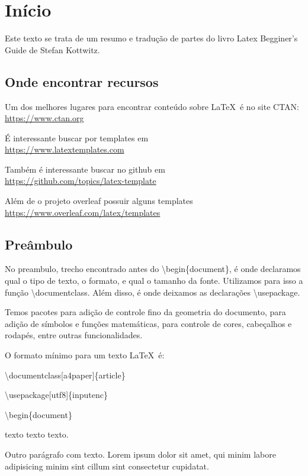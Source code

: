 \documentclass[a4paper, 12pt, oneside]{book}
\begin{document}


\chapter{Início}
Este texto se trata de um resumo e tradução de partes do livro Latex Begginer's Guide de Stefan Kottwitz.

\section{Onde encontrar recursos}
Um dos melhores lugares para encontrar conteúdo sobre \LaTeX\ é no site CTAN:\\
\indent \url{https://www.ctan.org}

É interessante buscar por templates em\\
\indent \url{https://www.latextemplates.com}

Também é interessante buscar no github em\\
\indent \url{https://github.com/topics/latex-template}

Além de o projeto overleaf possuir alguns templates\\
\indent \url{https://www.overleaf.com/latex/templates}

\section{Preâmbulo}
No preambulo, trecho encontrado antes do \textbackslash begin\{document\},
é onde declaramos qual o tipo de texto, o formato, e qual o tamanho da fonte.
Utilizamos para isso a função \textbackslash documentclass.
Além disso, é onde deixamos as declarações \textbackslash usepackage.

Temos pacotes para adição de controle fino da geometria do documento,
para adição de símbolos e funções matemáticas,
para controle de cores, cabeçalhos e rodapés, entre outras funcionalidades.

O formato mínimo para um texto \LaTeX\ é:

\indent \textbackslash documentclass[a4paper]\{article\}

\textbackslash usepackage[utf8]\{inputenc\}

\textbackslash begin\{document\}

texto texto texto.

Outro parágrafo com texto.
Lorem ipsum dolor sit amet, qui minim labore adipisicing minim sint cillum sint consectetur cupidatat.
\end{document}
